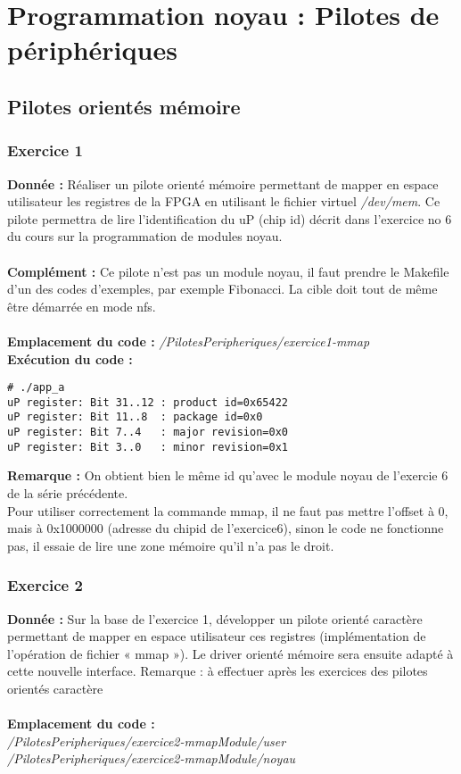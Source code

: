 \section{Programmation noyau : Pilotes de périphériques}
\subsection{Pilotes orientés mémoire}
\subsubsection{Exercice 1}
\textbf{Donnée : } Réaliser	un	pilote	orienté	mémoire	permettant	de	mapper	en	espace	utilisateur	les	registres	de	la	
 FPGA	en	utilisant	le	fichier	virtuel	\textit{/dev/mem}.	Ce	pilote	permettra	de	lire	l’identification	du	uP	
(chip	id)	décrit	dans	l’exercice	no 6 du	cours	sur	la	programmation	de	modules	noyau.\\\\
\textbf{Complément : } Ce pilote n'est pas un module noyau, il faut prendre le Makefile d'un des codes d'exemples, par exemple Fibonacci. La cible doit tout de même être démarrée en mode nfs.\\\\
\textbf{Emplacement du code : } \textit{/PilotesPeripheriques/exercice1-mmap}\\

\textbf{Exécution du code : } \\
\begin{lstlisting}
# ./app_a                                                                       
uP register: Bit 31..12 : product id=0x65422                                    
uP register: Bit 11..8  : package id=0x0                                        
uP register: Bit 7..4   : major revision=0x0                                    
uP register: Bit 3..0   : minor revision=0x1 
\end{lstlisting}

\textbf{Remarque : } On obtient bien le même id qu'avec le module noyau de l'exercie 6 de la série précédente.\\
Pour utiliser correctement la commande mmap, il ne faut pas mettre l'offset à 0, mais à 0x1000000 (adresse du chipid de l'exercice6), sinon le code ne fonctionne pas, il essaie de lire une zone mémoire qu'il n'a pas le droit.

\subsubsection{Exercice 2}
\textbf{Donnée : } Sur	la	base	de	l’exercice	1,	développer	un	pilote	orienté	caractère	permettant	de	mapper	en	
espace	utilisateur	ces registres	(implémentation	de	l’opération	de	fichier	« mmap »).	
Le	driver	orienté	mémoire	sera	ensuite	adapté	à	cette	nouvelle	interface.
Remarque :	à	effectuer	après	les	exercices	des	pilotes	orientés	caractère\\\\
\textbf{Emplacement du code : }\\ \textit{/PilotesPeripheriques/exercice2-mmapModule/user}\\
\textit{/PilotesPeripheriques/exercice2-mmapModule/noyau}\\


